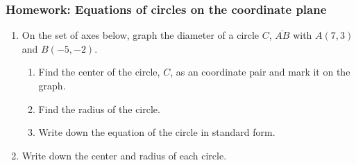 \documentclass[12pt, twoside]{article}
\begin{document}
\subsubsection*{Homework: Equations of circles on the coordinate plane}
  \begin{enumerate}


  \item On the set of axes below, graph the diameter of a circle $C$,  $\overline{AB}$ with $A(7,3)$ and $B(-5,-2)$.
    \begin{center} %
    \end{center}
    \begin{enumerate}
      \item Find the center of the circle, $C$, as an coordinate pair and mark it on the graph. \vspace{3cm}
      \item Find the radius of the circle. \vspace{3cm}
      \item Write down the equation of the circle in standard form.
    \end{enumerate}

\newpage

\item Write down the center and radius of each circle.
  \begin{enumerate}
  \end{enumerate}
  \vspace{2.5cm}


\end{enumerate}
\end{document}

